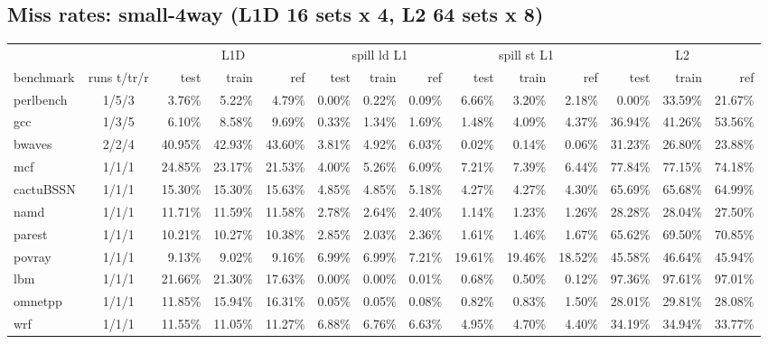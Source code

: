 \documentclass[10pt,a4paper,landscape]{article}
\begin{document}
\subsection*{Miss rates: small-4way (L1D 16 sets x 4, L2 64 sets x 8)}
{\footnotesize
\begin{longtable}{lcrrrrrrrrrrrr}
\toprule
& & \multicolumn{3}{c}{L1D} & \multicolumn{3}{c}{spill ld L1} & \multicolumn{3}{c}{spill st L1} & \multicolumn{3}{c}{L2} \\
\cmidrule(lr){3-5}\cmidrule(lr){6-8}\cmidrule(lr){9-11}\cmidrule(lr){12-14}
benchmark & runs t/tr/r & test & train & ref & test & train & ref & test & train & ref & test & train & ref \\
\midrule
\endhead
\bottomrule
\endfoot
perlbench & 1/5/3 & 3.76\% & 5.22\% & 4.79\% & 0.00\% & 0.22\% & 0.09\% & 6.66\% & 3.20\% & 2.18\% & 0.00\% & 33.59\% & 21.67\% \\
gcc & 1/3/5 & 6.10\% & 8.58\% & 9.69\% & 0.33\% & 1.34\% & 1.69\% & 1.48\% & 4.09\% & 4.37\% & 36.94\% & 41.26\% & 53.56\% \\
bwaves & 2/2/4 & 40.95\% & 42.93\% & 43.60\% & 3.81\% & 4.92\% & 6.03\% & 0.02\% & 0.14\% & 0.06\% & 31.23\% & 26.80\% & 23.88\% \\
mcf & 1/1/1 & 24.85\% & 23.17\% & 21.53\% & 4.00\% & 5.26\% & 6.09\% & 7.21\% & 7.39\% & 6.44\% & 77.84\% & 77.15\% & 74.18\% \\
cactuBSSN & 1/1/1 & 15.30\% & 15.30\% & 15.63\% & 4.85\% & 4.85\% & 5.18\% & 4.27\% & 4.27\% & 4.30\% & 65.69\% & 65.68\% & 64.99\% \\
namd & 1/1/1 & 11.71\% & 11.59\% & 11.58\% & 2.78\% & 2.64\% & 2.40\% & 1.14\% & 1.23\% & 1.26\% & 28.28\% & 28.04\% & 27.50\% \\
parest & 1/1/1 & 10.21\% & 10.27\% & 10.38\% & 2.85\% & 2.03\% & 2.36\% & 1.61\% & 1.46\% & 1.67\% & 65.62\% & 69.50\% & 70.85\% \\
povray & 1/1/1 & 9.13\% & 9.02\% & 9.16\% & 6.99\% & 6.99\% & 7.21\% & 19.61\% & 19.46\% & 18.52\% & 45.58\% & 46.64\% & 45.94\% \\
lbm & 1/1/1 & 21.66\% & 21.30\% & 17.63\% & 0.00\% & 0.00\% & 0.01\% & 0.68\% & 0.50\% & 0.12\% & 97.36\% & 97.61\% & 97.01\% \\
omnetpp & 1/1/1 & 11.85\% & 15.94\% & 16.31\% & 0.05\% & 0.05\% & 0.08\% & 0.82\% & 0.83\% & 1.50\% & 28.01\% & 29.81\% & 28.08\% \\
wrf & 1/1/1 & 11.55\% & 11.05\% & 11.27\% & 6.88\% & 6.76\% & 6.63\% & 4.95\% & 4.70\% & 4.40\% & 34.19\% & 34.94\% & 33.77\% \\

\end{longtable}}
\end{document}
